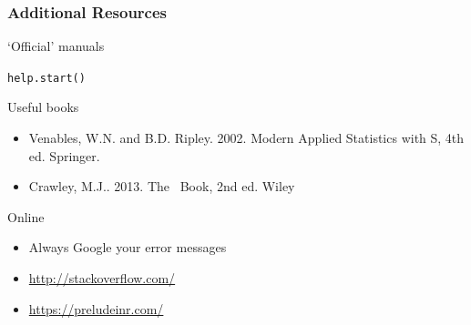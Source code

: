 \documentclass[color=usenames,dvipsnames]{beamer}\usepackage[]{graphicx}\usepackage[]{color}
\makeatletter
\newcommand{\hlstd}[1]{\textcolor[rgb]{0,0,0}{#1}}%
\newcommand{\hlkwd}[1]{\textcolor[rgb]{0.004,0.004,0.506}{#1}}%
\newenvironment{kframe}{%
 \def\at@end@of@kframe{}%
 \ifinner\ifhmode%
  \def\at@end@of@kframe{\end{minipage}}%
  \begin{minipage}{\columnwidth}%
 \fi\fi%
 \def\FrameCommand##1{\hskip\@totalleftmargin \hskip-\fboxsep
 \colorbox{shadecolor}{##1}\hskip-\fboxsep
     \hskip-\linewidth \hskip-\@totalleftmargin \hskip\columnwidth}%
 \MakeFramed {\advance\hsize-\width
   \@totalleftmargin\z@ \linewidth\hsize
   \@setminipage}}%
 {\par\unskip\endMakeFramed%
 \at@end@of@kframe}
\newenvironment{knitrout}{}{} %
\makeatother
\begin{document}
\begin{frame}[fragile]
  \frametitle{Additional Resources}
  \large
  `Official' manuals
\begin{knitrout}
\color{fgcolor}\begin{kframe}
\begin{alltt}
\hlkwd{help.start}\hlstd{()}
\end{alltt}
\end{kframe}
\end{knitrout}
\vfill
Useful books
\begin{itemize}
  \large
\item Venables, W.N. and B.D. Ripley. 2002. Modern Applied Statistics with
  S, 4th ed. Springer.
\item Crawley, M.J.. 2013. The \R~Book, 2nd ed. Wiley
\end{itemize}
\vfill
Online
    \begin{itemize}
      \large
      \item Always Google your error messages
      \item \url{http://stackoverflow.com/}
      \item \url{https://preludeinr.com/}
    \end{itemize}
\end{frame}
\end{document}
